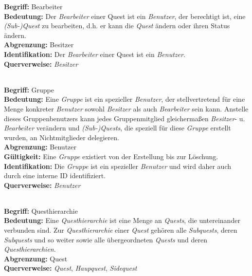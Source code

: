 \documentclass{article}
\begin{document}
\begin{samepage}
\textbf{Begriff:} Bearbeiter \\
\textbf{Bedeutung:} Der \textit{Bearbeiter} einer Quest ist ein \textit{Benutzer}, der berechtigt ist, eine \textit{(Sub-)Quest} zu bearbeiten, d.h. er kann die \textit{Quest} ändern oder ihren Status ändern.\\
\textbf{Abgrenzung:} Besitzer \\
\textbf{Identifikation:} Der \textit{Bearbeiter}  einer Quest ist ein \textit{Benutzer}. \\
\textbf{Querverweise:} \textit{Besitzer} \\ \\
\end{samepage}

\begin{samepage}
\textbf{Begriff:} Gruppe \\
\textbf{Bedeutung:} Eine \textit{Gruppe} ist ein spezieller \textit{Benutzer}, der stellvertretend für eine Menge konkreter \textit{Benutzer} sowohl \textit{Besitzer} als auch \textit{Bearbeiter} sein kann. Anstelle dieses Gruppenbenutzers kann jedes Gruppenmitglied gleichermaßen \textit{Besitzer}- u. \textit{Bearbeiter} verändern und \textit{(Sub-)Quests}, die speziell für diese \textit{Gruppe} erstellt wurden, an Nichtmitglieder delegieren. \\
\textbf{Abgrenzung:} Benutzer \\
\textbf{Gültigkeit:} Eine \textit{Gruppe} existiert von der Erstellung bis zur Löschung. \\
\textbf{Identifikation:} Die \textit{Gruppe} ist ein spezieller \textit{Benutzer} und wird daher auch durch eine interne ID identifiziert. \\
\textbf{Querverweise:} \textit{Benutzer} \\ \\
\end{samepage}

\begin{samepage}
\textbf{Begriff:} Questhierarchie \\
\textbf{Bedeutung:} Eine \textit{Questhierarchie} ist eine Menge an \textit{Quests}, die untereinander verbunden sind. Zur \textit{Questhierarchie} einer \textit{Quest} gehören alle \textit{Subquests}, deren \textit{Subquests} und so weiter sowie alle übergeordneten \textit{Quests} und deren \textit{Questhierarchien}.\\
\textbf{Abgrenzung:} Quest \\
\textbf{Querverweise:} \textit{Quest}, \textit{Haupquest}, \textit{Sidequest} \\ \\
\end{samepage}
\end{document}
